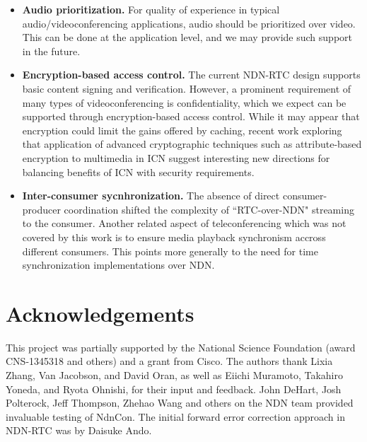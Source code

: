 \documentclass{icn/sig-alternate-2013} %
\newcommand{\ndnrtcName}{NDN-RTC} %
\newcommand{\ndnconName}{NdnCon}
\begin{document}
\begin{itemize}[label={}]
\item \textbf{Audio prioritization.}  For quality of experience in typical audio/videoconferencing applications, audio should be prioritized over video.  This can be done at the application level, and we may provide such support in the future. %

\item \textbf{Encryption-based access control.} The current \ndnrtcName{} design supports basic content signing and verification. However, a prominent requirement of many types of videoconferencing is confidentiality, which we expect can be supported through encryption-based access control.  While it may appear that encryption could limit the gains offered by caching, recent work exploring that application of advanced cryptographic techniques such as attribute-based encryption to multimedia in ICN \cite{papanis2014use} suggest interesting new directions for balancing benefits of ICN with security requirements. 

\item \textbf{Inter-consumer sycnhronization.} The absence of direct consumer-producer coordination shifted the complexity of ``RTC-over-NDN" streaming to the consumer. Another related aspect of teleconferencing which was not covered by this work is to ensure media playback synchronism accross different consumers.   This points more generally to the need for time synchronization implementations over NDN. 

\end{itemize}

\section{Acknowledgements}
\label{sec:Acknowledgements}
This project was partially supported by the National Science Foundation (award CNS-1345318 and others) and a grant from Cisco. The authors thank Lixia Zhang, Van Jacobson, and David Oran, as well as Eiichi Muramoto, Takahiro Yoneda, and Ryota Ohnishi, for their input and feedback. John DeHart, Josh Polterock, Jeff Thompson, Zhehao Wang and others on the NDN team provided invaluable testing of \ndnconName{}.  The initial forward error correction approach in \ndnrtcName{} was by Daisuke Ando. 


{\small

}
\end{document}
